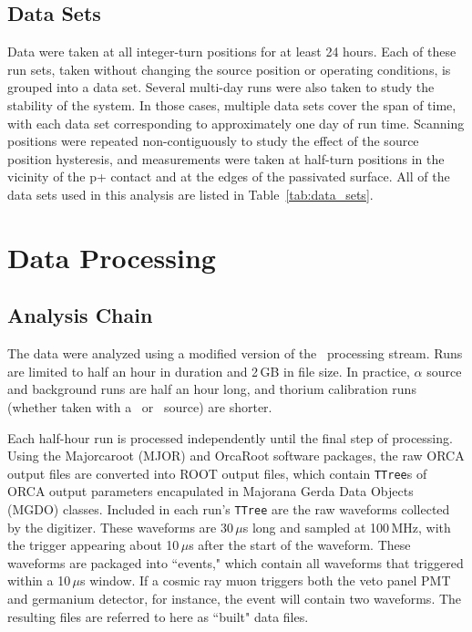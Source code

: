 \documentclass[groupedaddress,rmp,amsmath,amssymb,bibnotes,altaffilletter,twocolumn]{revtex4-1}
\begin{document}
\subsection{Data Sets}
Data were taken at all integer-turn positions for at least 24 hours. Each of these run sets, taken without changing the source position or operating conditions, is grouped into a data set. Several multi-day runs were also taken to study the stability of the system. In those cases, multiple data sets cover the span of time, with each data set corresponding to approximately one day of run time. Scanning positions were repeated non-contiguously to study the effect of the source position hysteresis, and measurements were taken at half-turn positions in the vicinity of the p+ contact and at the edges of the passivated surface. All of the data sets used in this analysis are listed in Table~\ref{tab:data_sets}.  

%

\section{Data Processing}
\subsection{Analysis Chain}
The data were analyzed using a modified version of the \MJ\ processing stream. Runs are limited to half an hour in duration and 2\,GB in file size. In practice, $\alpha$ source and background runs are half an hour long, and thorium calibration runs (whether taken with a \thtte\ or \thttt\ source) are shorter.

Each half-hour run is processed independently until the final step of processing. Using the Majorcaroot (MJOR)  and OrcaRoot software packages, the raw ORCA output files are converted into ROOT output files, which contain {\tt TTree}s of ORCA output parameters encapulated in Majorana Gerda Data Objects (MGDO) classes. Included in each run's {\tt TTree} are the raw waveforms collected by the digitizer. These waveforms are 30\,$\mu$s long and sampled at 100\,MHz, with the trigger appearing about 10\,$\mu$s after the start of the waveform. These waveforms are packaged into ``events," which contain all waveforms that triggered within a 10\,$\mu$s window. If a cosmic ray muon triggers both the veto panel PMT and germanium detector, for instance, the event will contain two waveforms. The resulting files are referred to here as ``built" data files.
\end{document}
